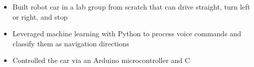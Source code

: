 {
	\begin{itemize}
		\item Built robot car in a lab group from scratch that can drive straight, turn left or right, and stop 
		\item Leveraged machine learning with Python to process voice commands and classify them as navigation directions
		\item Controlled the car via an Arduino microcontroller and C
	\end{itemize}
}
